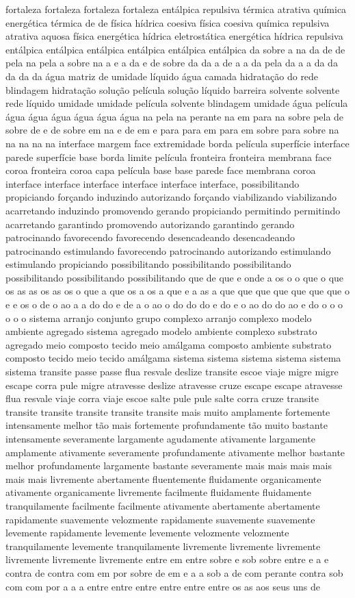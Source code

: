 fortaleza fortaleza fortaleza fortaleza entálpica repulsiva térmica atrativa química energética térmica de de física hídrica coesiva física coesiva química repulsiva atrativa aquosa física energética hídrica eletrostática energética hídrica repulsiva entálpica entálpica entálpica entálpica entálpica entálpica da sobre a na da de de pela na pela a sobre na a e a da e de sobre da da a de a a da pela da a a da da da da da água matriz de umidade líquido água camada hidratação do rede blindagem hidratação solução película solução líquido barreira solvente solvente rede líquido umidade umidade película solvente blindagem umidade água película água água água água água água na pela na perante na em para na sobre pela de sobre de e de sobre em na e de em e para para em para em sobre para sobre na na na na na interface margem face extremidade borda película superfície interface parede superfície base borda limite película fronteira fronteira membrana face coroa fronteira coroa capa película base base parede face membrana coroa interface interface interface interface interface interface, possibilitando propiciando forçando induzindo autorizando forçando viabilizando viabilizando acarretando induzindo promovendo gerando propiciando permitindo permitindo acarretando garantindo promovendo autorizando garantindo gerando patrocinando favorecendo favorecendo desencadeando desencadeando patrocinando estimulando favorecendo patrocinando autorizando estimulando estimulando propiciando possibilitando possibilitando possibilitando possibilitando possibilitando possibilitando que de que e onde a os o o que o que os as as os as os o que a que os a os a que e a as a que que que que que que que o e e os o de o ao a a do do e de a o ao o do do do e do e o ao do do ao e do o o o o o o sistema arranjo conjunto grupo complexo arranjo complexo modelo ambiente agregado sistema agregado modelo ambiente complexo substrato agregado meio composto tecido meio amálgama composto ambiente substrato composto tecido meio tecido amálgama sistema sistema sistema sistema sistema sistema transite passe passe flua resvale deslize transite escoe viaje migre migre escape corra pule migre atravesse deslize atravesse cruze escape escape atravesse flua resvale viaje corra viaje escoe salte pule pule salte corra cruze transite transite transite transite transite transite mais muito amplamente fortemente intensamente melhor tão mais fortemente profundamente tão muito bastante intensamente severamente largamente agudamente ativamente largamente amplamente ativamente severamente profundamente ativamente melhor bastante melhor profundamente largamente bastante severamente mais mais mais mais mais mais livremente abertamente fluentemente fluidamente organicamente ativamente organicamente livremente facilmente fluidamente fluidamente tranquilamente facilmente facilmente ativamente abertamente abertamente rapidamente suavemente velozmente rapidamente suavemente suavemente levemente rapidamente levemente levemente velozmente velozmente tranquilamente levemente tranquilamente livremente livremente livremente livremente livremente livremente entre em entre sobre e sob sobre entre e a e contra de contra com em por sobre de em e a a sob a de com perante contra sob com com por a a a entre entre entre entre entre entre os as aos seus uns de 